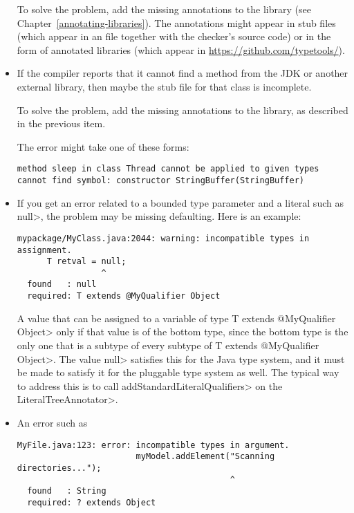 \begin{itemize}
To solve the problem, add the missing annotations to the library (see
Chapter~\ref{annotating-libraries}).  The
annotations might appear in stub files (which appear
in an  file together with the checker's source code)
or in the form of annotated libraries (which appear
in \url{https://github.com/typetools/}).

\item
If the compiler reports that it cannot find a method from the JDK or
another external library, then maybe the stub file for that class
is incomplete.

To solve the problem, add the missing annotations to the library, as
described in the previous item.

The error might take one of these forms:

\begin{Verbatim}
method sleep in class Thread cannot be applied to given types
cannot find symbol: constructor StringBuffer(StringBuffer)
\end{Verbatim}

\item
If you get an error related to a bounded type parameter and a literal such
as \<null>, the problem may be missing defaulting.  Here is an example:

\begin{Verbatim}
mypackage/MyClass.java:2044: warning: incompatible types in assignment.
      T retval = null;
                 ^
  found   : null
  required: T extends @MyQualifier Object
\end{Verbatim}

\noindent
A value that can be assigned to a variable of type \<T extends @MyQualifier
Object> only if that value is of the bottom type, since the bottom type is
the only one that is a subtype of every subtype of \<T extends @MyQualifier
Object>.  The value \<null> satisfies this for the Java type system, and it
must be made to satisfy it for the pluggable type system as well.  The
typical way to address this is to call \<addStandardLiteralQualifiers> on the \<LiteralTreeAnnotator>.

\item
An error such as

\begin{Verbatim}
MyFile.java:123: error: incompatible types in argument.
                        myModel.addElement("Scanning directories...");
                                           ^
  found   : String
  required: ? extends Object
\end{Verbatim}


\end{itemize}
